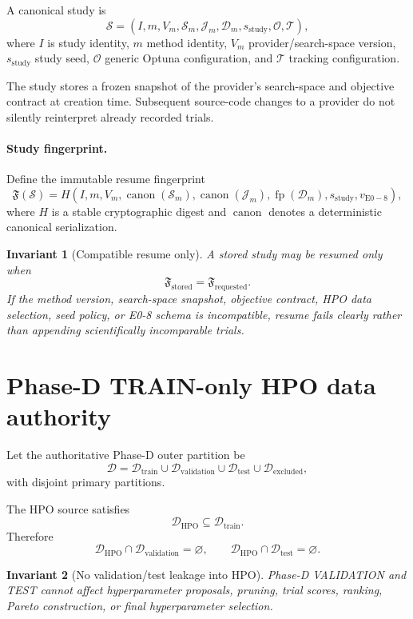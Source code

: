\documentclass[11pt]{article}
\newcommand{\Study}{\mathcal{S}}
\newcommand{\Data}{\mathcal{D}}
\newcommand{\Fingerprint}{\mathfrak{F}}
\newtheorem{invariant}{Invariant}
\begin{document}
A canonical study is
\[
\boxed{
\Study=
(I,m,V_m,\mathcal S_m,\mathcal J_m,\mathcal D_m,s_{\mathrm{study}},
\mathcal O,\mathcal T),
}
\]
where $I$ is study identity, $m$ method identity, $V_m$ provider/search-space
version, $s_{\mathrm{study}}$ study seed, $\mathcal O$ generic Optuna
configuration, and $\mathcal T$ tracking configuration.

The study stores a frozen snapshot of the provider's search-space and objective
contract at creation time. Subsequent source-code changes to a provider do not
silently reinterpret already recorded trials.

\paragraph{Study fingerprint.}
Define the immutable resume fingerprint
\[
\boxed{
\Fingerprint(\Study)
=
H\!\left(
I,m,V_m,\operatorname{canon}(\mathcal S_m),
\operatorname{canon}(\mathcal J_m),
\operatorname{fp}(\mathcal D_m),
s_{\mathrm{study}},v_{\mathrm{E0-8}}
\right),
}
\]
where $H$ is a stable cryptographic digest and $\operatorname{canon}$ denotes a
deterministic canonical serialization.

\begin{invariant}[Compatible resume only]
A stored study may be resumed only when
\[
\Fingerprint_{\mathrm{stored}}=\Fingerprint_{\mathrm{requested}}.
\]
If the method version, search-space snapshot, objective contract, HPO data
selection, seed policy, or E0-8 schema is incompatible, resume fails clearly
rather than appending scientifically incomparable trials.
\end{invariant}

\section{Phase-D TRAIN-only HPO data authority}

Let the authoritative Phase-D outer partition be
\[
\Data
=
\Data_{\mathrm{train}}
\cup
\Data_{\mathrm{validation}}
\cup
\Data_{\mathrm{test}}
\cup
\Data_{\mathrm{excluded}},
\]
with disjoint primary partitions.

The HPO source satisfies
\[
\boxed{
\Data_{\mathrm{HPO}}\subseteq\Data_{\mathrm{train}}.
}
\]
Therefore
\[
\Data_{\mathrm{HPO}}\cap\Data_{\mathrm{validation}}=\varnothing,
\qquad
\Data_{\mathrm{HPO}}\cap\Data_{\mathrm{test}}=\varnothing.
\]

\begin{invariant}[No validation/test leakage into HPO]
Phase-D VALIDATION and TEST cannot affect hyperparameter proposals, pruning,
trial scores, ranking, Pareto construction, or final hyperparameter selection.
\end{invariant}
\end{document}

